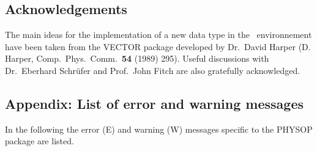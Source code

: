 \subsection*{Acknowledgements}
The main ideas for the implementation of a new data type in the \REDUCE\
environnement have been taken from the VECTOR package developed by
Dr.\ David Harper (D. Harper, Comp.\ Phys.\ Comm.\ {\bf 54} (1989)
295).
Useful discussions with  Dr.\ Eberhard Schr\"ufer  and
Prof.\ John Fitch are also gratefully acknowledged.


\subsection{Appendix: List of error and warning messages}
In the following the error (E) and warning (W) messages specific to the
PHYSOP package are listed.
